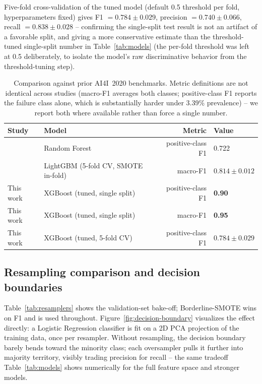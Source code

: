 \documentclass[11pt]{article}
\begin{document}
Five-fold cross-validation of the tuned model (default 0.5 threshold per fold, hyperparameters
fixed) gives F1 $= 0.784 \pm 0.029$, precision $= 0.740 \pm 0.066$, recall $= 0.838 \pm 0.028$ --
confirming the single-split test result is not an artifact of a favorable split, and giving a more
conservative estimate than the threshold-tuned single-split number in Table~\ref{tab:models} (the
per-fold threshold was left at 0.5 deliberately, to isolate the model's raw discriminative behavior
from the threshold-tuning step).

\begin{table}[htbp]
\centering
\caption{Comparison against prior AI4I~2020 benchmarks. Metric definitions are not identical across
studies (macro-F1 averages both classes; positive-class F1 reports the failure class alone, which
is substantially harder under 3.39\% prevalence) -- we report both where available rather than
force a single number.}
\label{tab:priorwork}
\begin{tabular}{@{}llrl@{}}
\toprule
Study & Model & Metric & Value \\
\midrule
\citet{physicsinformed2026} & Random Forest & positive-class F1 & 0.722 \\
\citet{connectedvehicles2026} & LightGBM (5-fold CV, SMOTE in-fold) & macro-F1 & $0.814 \pm 0.012$ \\
This work & XGBoost (tuned, single split) & positive-class F1 & \textbf{0.90} \\
This work & XGBoost (tuned, single split) & macro-F1 & \textbf{0.95} \\
This work & XGBoost (tuned, 5-fold CV) & positive-class F1 & $0.784 \pm 0.029$ \\
\bottomrule
\end{tabular}
\end{table}

\subsection{Resampling comparison and decision boundaries}
Table~\ref{tab:resamplers} shows the validation-set bake-off; Borderline-SMOTE wins on F1 and is
used throughout. Figure~\ref{fig:decision-boundary} visualizes the effect directly: a Logistic
Regression classifier is fit on a 2D PCA projection of the training data, once per resampler. Without
resampling, the decision boundary barely bends toward the minority class; each oversampler pulls it
further into majority territory, visibly trading precision for recall -- the same tradeoff
Table~\ref{tab:models} shows numerically for the full feature space and stronger models.
\end{document}
